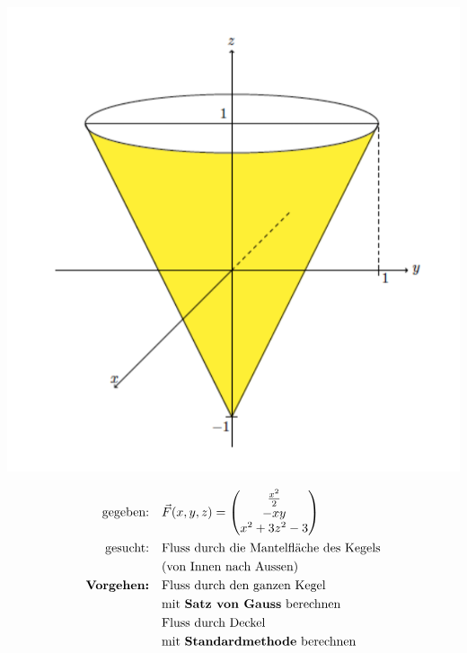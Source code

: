 \documentclass[11pt]{article}
\begin{document}
\begin{minipage}[c]{0.5\textwidth}
\centering
\includegraphics[width=\linewidth,keepaspectratio=true]{images/fluss}
\end{minipage}
%
\begin{minipage}[c]{0.5\textwidth}
\begin{equation*}
\begin{split}
	\text{gegeben:}\quad & \vec{F}(x,y,z) = \begin{pmatrix}
		\frac{x^2}{2} \\ -xy \\ x^2 + 3z^2 - 3
	\end{pmatrix} \\
	\text{gesucht:}\quad & \text{Fluss durch die Mantelfläche des Kegels} \\
	& \text{(von Innen nach Aussen)} \\
	\textbf{Vorgehen:}\quad & \text{Fluss durch den ganzen Kegel} \\
	& \text{mit \textbf{Satz von Gauss} berechnen} \\
	& \text{Fluss durch Deckel} \\
	& \text{mit \textbf{Standardmethode} berechnen}
\end{split}
\end{equation*}
\end{minipage}
\end{document}
